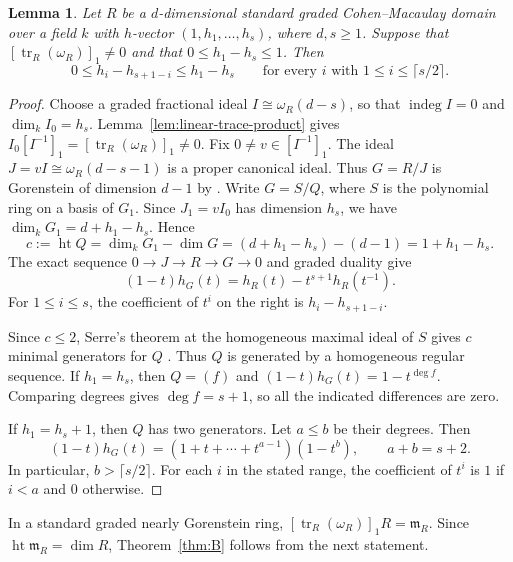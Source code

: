 \documentclass[a4paper,11pt]{amsart}
\DeclareMathOperator{\tr}{tr}
\DeclareMathOperator{\indeg}{indeg}
\DeclareMathOperator{\height}{ht}
\newcommand{\kk}{k}
\newcommand{\m}{\mathfrak{m}}
\newtheorem{lemma}[theorem]{Lemma}
\theoremstyle{definition}
\begin{document}
\begin{lemma}\label{lem:opposite-entries}
Let $R$ be a $d$-dimensional standard graded Cohen--Macaulay domain over a field $\kk$ with $h$-vector $(1,h_1,\ldots,h_s)$, where $d,s\geq1$. Suppose that $[\tr_R(\omega_R)]_1\ne0$ and that $0\leq h_1-h_s\leq1$. Then
\begin{equation}\label{eq:shifted-h-comparison}
 0\leq h_i-h_{s+1-i}\leq h_1-h_s\qquad\text{for every }i\text{ with }1\leq i\leq\lceil s/2\rceil.
\end{equation}
\end{lemma}
\begin{proof}
Choose a graded fractional ideal $I\cong\omega_R(d-s)$, so that $\indeg I=0$ and $\dim_{\kk} I_0=h_s$. Lemma~\ref{lem:linear-trace-product} gives $I_0[I^{-1}]_1=[\tr_R(\omega_R)]_1\ne0$. Fix $0\ne v\in[I^{-1}]_1$. The ideal $J=vI\cong\omega_R(d-s-1)$ is a proper canonical ideal. Thus $G=R/J$ is Gorenstein of dimension $d-1$ by \cite[Proposition~3.3.18~(b)]{BH98}. Write $G=S/Q$, where $S$ is the polynomial ring on a basis of $G_1$. Since $J_1=vI_0$ has dimension $h_s$, we have $\dim_{\kk}G_1=d+h_1-h_s$. Hence
\[
 c:=\height Q=\dim_{\kk}G_1-\dim G=(d+h_1-h_s)-(d-1)=1+h_1-h_s.
\]
The exact sequence $0\to J\to R\to G\to0$ and graded duality give
\[
 (1-t)h_G(t)=h_R(t)-t^{s+1}h_R(t^{-1}).
\]
For $1\leq i\leq s$, the coefficient of $t^i$ on the right is $h_i-h_{s+1-i}$.

Since $c\le2$, Serre's theorem at the homogeneous maximal ideal of $S$ gives $c$ minimal generators for $Q$ \cite[Corollary~21.20]{E95}. Thus $Q$ is generated by a homogeneous regular sequence. If $h_1=h_s$, then $Q=(f)$ and $(1-t)h_G(t)=1-t^{\deg f}$. Comparing degrees gives $\deg f=s+1$, so all the indicated differences are zero.

If $h_1=h_s+1$, then $Q$ has two generators. Let $a\leq b$ be their degrees. Then
\[
 (1-t)h_G(t)=(1+t+\cdots+t^{a-1})(1-t^b),\qquad a+b=s+2.
\]
In particular, $b>\lceil s/2\rceil$. For each $i$ in the stated range, the coefficient of $t^i$ is $1$ if $i<a$ and $0$ otherwise.
\end{proof}

In a standard graded nearly Gorenstein ring, $[\tr_R(\omega_R)]_1R=\m_R$. Since $\height\m_R=\dim R$, Theorem~\ref{thm:B} follows from the next statement.
\end{document}
